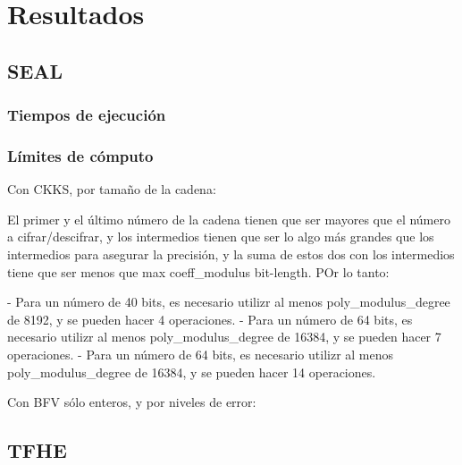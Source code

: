 \chapter{Resultados}
\label{chap:resultados}

\section{SEAL}

\subsection{Tiempos de ejecución}

\subsection{Límites de cómputo}

Con CKKS, por tamaño de la cadena:

El primer y el último número de la cadena tienen que ser mayores que el número a cifrar/descifrar, y los intermedios tienen que ser lo algo más grandes  que los intermedios para asegurar la precisión, y la suma de estos dos con los intermedios tiene que ser menos que max coeff_modulus bit-length. POr lo tanto:

- Para un número de 40 bits, es necesario utilizr al menos poly_modulus_degree de 8192, y se pueden hacer 4 operaciones.
- Para un número de 64 bits, es necesario utilizr al menos poly_modulus_degree de 16384, y se pueden hacer 7 operaciones.
- Para un número de 64 bits, es necesario utilizr al menos poly_modulus_degree de 16384, y se pueden hacer 14 operaciones.



Con BFV sólo enteros, y por niveles de error:



\section{TFHE}

